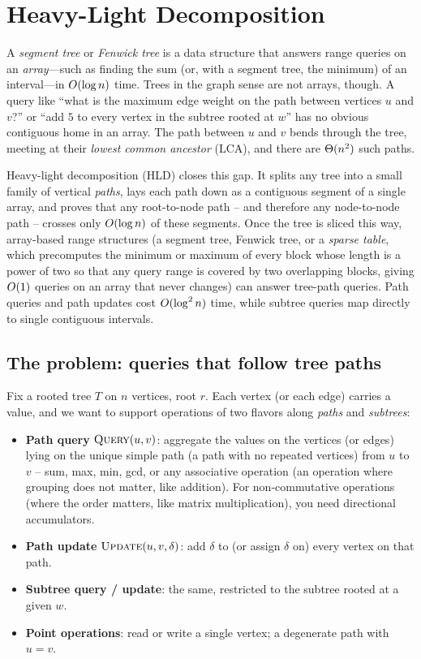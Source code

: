 \chapter{Heavy-Light Decomposition}

A \emph{segment tree} or \emph{Fenwick tree} is a data structure that answers range queries on an \emph{array}---such as finding the sum (or, with a segment tree, the minimum) of an interval---in $O(\log n)$ time. Trees in the graph sense are not arrays, though. A query like ``what is the maximum edge weight on the path between vertices $u$ and $v$?'' or ``add $5$ to every vertex in the subtree rooted at $w$'' has no obvious contiguous home in an array. The path between $u$ and $v$ bends through the tree, meeting at their \emph{lowest common ancestor} ($\mathrm{LCA}$), and there are $\Theta(n^2)$ such paths.

Heavy-light decomposition (HLD) closes this gap. It splits any tree into a small family of vertical \emph{paths}, lays each path down as a contiguous segment of a single array, and proves that any root-to-node path -- and therefore any node-to-node path -- crosses only $O(\log n)$ of these segments. Once the tree is sliced this way, array-based range structures (a segment tree, Fenwick tree, or a \emph{sparse table}, which precomputes the minimum or maximum of every block whose length is a power of two so that any query range is covered by two overlapping blocks, giving $O(1)$ queries on an array that never changes) can answer tree-path queries. Path queries and path updates cost $O(\log^2 n)$ time, while subtree queries map directly to single contiguous intervals.

\chapterline

\section{The problem: queries that follow tree paths}
\label{ch19:problem}

Fix a rooted tree $T$ on $n$ vertices, root $r$. Each vertex (or each edge) carries a value, and we
want to support operations of two flavors along \emph{paths} and \emph{subtrees}:

\begin{itemize}
  \item \textbf{Path query} $\textsc{Query}(u,v)$: aggregate the values on the vertices (or edges)
        lying on the unique simple path (a path with no repeated vertices) from $u$ to $v$ -- sum, max, min, gcd, or any associative
        operation (an operation where grouping does not matter, like addition). For non-commutative operations (where the order matters, like matrix multiplication), you need directional accumulators.
  \item \textbf{Path update} $\textsc{Update}(u,v,\delta)$: add $\delta$ to (or assign $\delta$ on)
        every vertex on that path.
  \item \textbf{Subtree query / update}: the same, restricted to the subtree rooted at a given $w$.
  \item \textbf{Point operations}: read or write a single vertex; a degenerate path with $u=v$.
\end{itemize}

